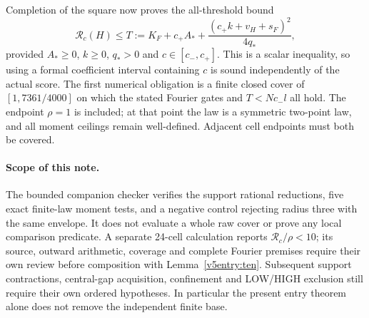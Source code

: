 Completion of the square now proves the all-threshold bound
\begin{equation}\label{v5entry:scalar}
 \mathcal R_c(H)\le
 T:=K_F+c_+A_*+\frac{(c_+k+v_H+s_F)^2}{4q_*},
\end{equation}
provided $A_*\ge0$, $k\ge0$, $q_*>0$ and $c\in[c_-,c_+]$.
This is a scalar inequality, so using a formal coefficient interval
containing $c$ is sound independently of the actual score.
The first numerical obligation is a finite closed cover of
$[1,7361/4000]$ on which the stated Fourier gates and
$T<Nc_-l$ all hold. The endpoint $\rho=1$ is included; at that point
the law is a symmetric two-point law, and all moment ceilings remain
well-defined. Adjacent cell endpoints must both be covered.

\paragraph{Scope of this note.}
The bounded companion checker verifies the support rational reductions,
five exact finite-law moment tests, and a negative control rejecting
radius three with the same envelope. It does not evaluate a whole raw
cover or prove any local comparison predicate. A separate 24-cell
calculation reports $\mathcal R_c/\rho<10$; its source, outward arithmetic,
coverage and complete Fourier premises require their own review before
composition with Lemma~\ref{v5entry:ten}. Subsequent support
contractions, central-gap acquisition, confinement and LOW/HIGH exclusion
still require their own ordered hypotheses. In particular the present
entry theorem alone does not remove the independent finite base.
